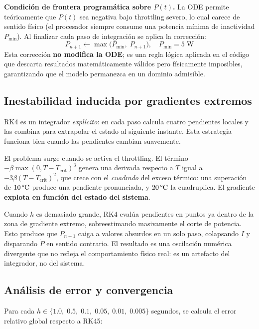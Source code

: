 \documentclass[10pt, twocolumn]{article}
\begin{document}
\noindent\textbf{Condición de frontera programática sobre $P(t)$.}
La ODE permite teóricamente que $P(t)$ sea negativa bajo throttling severo, lo cual
carece de sentido físico (el procesador siempre consume una potencia mínima de
inactividad $P_{\min}$). Al finalizar cada paso de integración se aplica la
corrección:
\begin{equation}
  P_{n+1} \leftarrow \max\!\bigl(P_{\min},\; P_{n+1}\bigr), \quad P_{\min} = 5\;\text{W}
\end{equation}
Esta corrección \textbf{no modifica la ODE}; es una regla lógica aplicada en el
código que descarta resultados matemáticamente válidos pero físicamente imposibles,
garantizando que el modelo permanezca en un dominio admisible.

\subsection{Inestabilidad inducida por gradientes extremos}

RK4 es un integrador \emph{explícito}: en cada paso calcula cuatro pendientes
locales y las combina para extrapolar el estado al siguiente instante. Esta
estrategia funciona bien cuando las pendientes cambian suavemente.

El problema surge cuando se activa el throttling. El término
$-\beta\max(0, T - T_{\text{crit}})^3$ genera una derivada respecto a $T$ igual a
$-3\beta(T - T_{\text{crit}})^2$, que crece con el \emph{cuadrado} del exceso
térmico: una superación de $10\,\text{\textdegree C}$ produce una pendiente
pronunciada, y $20\,\text{\textdegree C}$ la cuadruplica. El gradiente
\textbf{explota en función del estado del sistema}.

Cuando $h$ es demasiado grande, RK4 evalúa pendientes en puntos ya dentro de la
zona de gradiente extremo, sobreestimando masivamente el corte de potencia. Esto
produce que $P_{n+1}$ caiga a valores absurdos en un solo paso, colapsando $I$ y
disparando $\dot{P}$ en sentido contrario. El resultado es una oscilación numérica
divergente que no refleja el comportamiento físico real: es un artefacto del
integrador, no del sistema.

\subsection{Análisis de error y convergencia}

Para cada $h \in \{1.0,\; 0.5,\; 0.1,\; 0.05,\; 0.01,\; 0.005\}$ segundos, se
calcula el error relativo global respecto a RK45:
\end{document}
